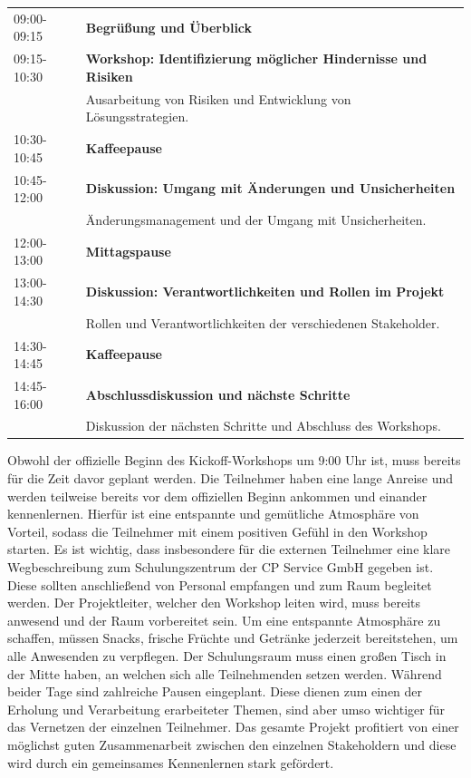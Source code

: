 \noindent
\begin{tabularx}{\textwidth}{@{}lX@{}}
	09:00-09:15 & \textbf{Begrüßung und Überblick}\\
	09:15-10:30 & \textbf{Workshop: Identifizierung möglicher Hindernisse und Risiken}\\
	& Ausarbeitung von Risiken und Entwicklung von Lösungsstrategien.\\
	10:30-10:45 & \textbf{Kaffeepause}\\
	10:45-12:00 & \textbf{Diskussion: Umgang mit Änderungen und Unsicherheiten}\\
	& Änderungsmanagement und der Umgang mit Unsicherheiten.\\
	12:00-13:00 & \textbf{Mittagspause}\\
	13:00-14:30 & \textbf{Diskussion: Verantwortlichkeiten und Rollen im Projekt}\\
	& Rollen und Verantwortlichkeiten der verschiedenen Stakeholder.\\
	14:30-14:45 & \textbf{Kaffeepause}\\
	14:45-16:00 & \textbf{Abschlussdiskussion und nächste Schritte}\\
	& Diskussion der nächsten Schritte und Abschluss des Workshops.\\
\end{tabularx}

\label{tab:agenda}
\clearpage

Obwohl der offizielle Beginn des Kickoff-Workshops um 9:00 Uhr ist, muss bereits für die Zeit davor geplant werden. Die Teilnehmer haben eine lange Anreise und werden teilweise bereits vor dem offiziellen Beginn ankommen und einander kennenlernen. Hierfür ist eine entspannte und gemütliche Atmosphäre von Vorteil, sodass die Teilnehmer mit einem positiven Gefühl in den Workshop starten. Es ist wichtig, dass insbesondere für die externen Teilnehmer eine klare Wegbeschreibung zum Schulungszentrum der CP Service GmbH gegeben ist. Diese sollten anschließend von Personal empfangen und zum Raum begleitet werden. Der Projektleiter, welcher den Workshop leiten wird, muss bereits anwesend und der Raum vorbereitet sein. Um eine entspannte Atmosphäre zu schaffen, müssen Snacks, frische Früchte und Getränke jederzeit bereitstehen, um alle Anwesenden zu verpflegen. Der Schulungsraum muss einen großen Tisch in der Mitte haben, an welchen sich alle Teilnehmenden setzen werden. Während beider Tage sind zahlreiche Pausen eingeplant. Diese dienen zum einen der Erholung und Verarbeitung erarbeiteter Themen, sind aber umso wichtiger für das Vernetzen der einzelnen Teilnehmer. Das gesamte Projekt profitiert von einer möglichst guten Zusammenarbeit zwischen den einzelnen Stakeholdern und diese wird durch ein gemeinsames Kennenlernen stark gefördert. 
\vspace{10pt}

